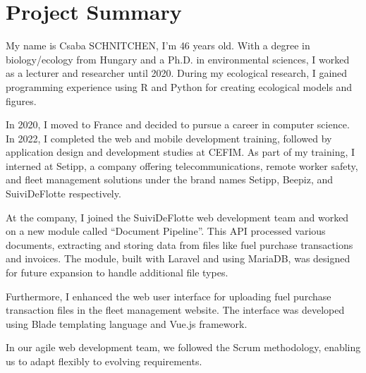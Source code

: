 \chapter{Project Summary}\label{ch:project-summary}


My name is Csaba SCHNITCHEN, I'm 46 years old. With a degree in biology/ecology from Hungary and a Ph.D. in environmental sciences, I worked as a lecturer and researcher until 2020. During my ecological research, I gained programming experience using R and Python for creating ecological models and figures.

In 2020, I moved to France and decided to pursue a career in computer science. In 2022, I completed the web and mobile development training, followed by application design and development studies at CEFIM. As part of my training, I interned at Setipp, a company offering telecommunications, remote worker safety, and fleet management solutions under the brand names Setipp, Beepiz, and SuiviDeFlotte respectively.

At the company, I joined the SuiviDeFlotte web development team and worked on a new module called \foreignquote{french}{Document Pipeline}. This API processed various documents, extracting and storing data from files like fuel purchase transactions and invoices. The module, built with Laravel and using MariaDB, was designed for future expansion to handle additional file types.

Furthermore, I enhanced the web user interface for uploading fuel purchase transaction files in the fleet management website. The interface was developed using Blade templating language and Vue.js framework.

In our agile web development team, we followed the Scrum methodology, enabling us to adapt flexibly to evolving requirements.